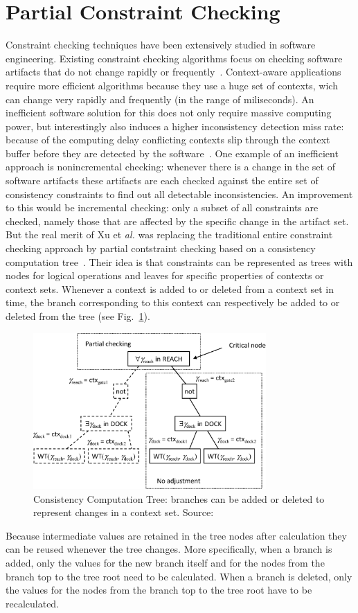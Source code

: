 \documentclass[journal]{vgtc}                %
\begin{document}
\section{Partial Constraint Checking}
Constraint checking techniques have been extensively studied in software engineering. Existing constraint checking algorithms focus on checking software artifacts that do not change rapidly or frequently~\cite{xu:2010:PCC}. Context-aware applications require more efficient algorithms because they use a huge set of contexts, wich can change very rapidly and frequently (in the range of miliseconds). An inefficient software solution for this does not only require massive computing power, but interestingly also induces a higher inconsistency detection miss rate: because of the computing delay conflicting contexts slip through the context buffer before they are detected by the software~\cite{xu:2010:PCC}. One example of an inefficient approach is nonincremental checking: whenever there is a change in the set of software artifacts these artifacts are each checked against the entire set of consistency constraints to find out all detectable inconsistencies. An improvement to this would be incremental checking: only a subset of all constraints are checked, namely those that are affected by the specific change in the artifact set. But the real merit of Xu et \textit{al.} was replacing the traditional entire constraint checking approach by partial contstraint checking based on a consistency computation tree~\cite{xu:2010:PCC}. Their idea is that constraints can be represented as trees with nodes for logical operations and leaves for specific properties of contexts or context sets. Whenever a context is added to or deleted from a context set in time, the branch corresponding to this context can respectively be added to or deleted from the tree (see Fig.~\ref{fig:cct}). 
\begin{figure}[htb]
  \centering
  \includegraphics[width=3.5in]{cons_comp_tree}
  \caption{Consistency Computation Tree: branches can be added or deleted to represent changes in a context set. Source:~\cite{xu:2010:PCC}}
  \label{fig:cct}
\end{figure}
Because intermediate values are retained in the tree nodes after calculation they can be reused whenever the tree changes. More specifically, when a branch is added, only the values for the new branch itself and for the nodes from the branch top to the tree root need to be calculated. When a branch is deleted, only the values for the nodes from the branch top to the tree root have to be recalculated. 
\end{document}
